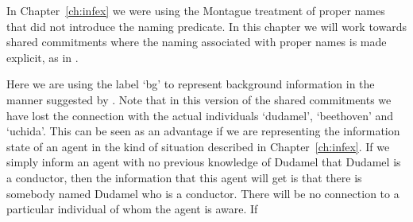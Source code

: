 In Chapter~\ref{ch:infex} we were using the Montague treatment of
proper names that did not introduce the naming predicate.  In this
chapter we will work towards shared commitments where the naming
associated with proper names is made explicit, as in \nexteg{}.
\begin{ex} 
\label{ex:gameboardDudamelBeethovenUchidaBg}  
\end{ex} 
Here we are using the label `bg' to represent background information
in the manner suggested by \cite{Larsson2010}.  Note that in this
version of the shared commitments we have lost the connection with the
actual individuals `dudamel', `beethoven' and `uchida'.  This can be
seen as an advantage if we are representing the information state of
an agent in the kind of situation described in Chapter~\ref{ch:infex}.
If we simply inform an agent with no previous knowledge of Dudamel that Dudamel
is a conductor, then the information that this agent will get is that
there is somebody named Dudamel who is a conductor.  There will be no
connection to a particular individual of whom the agent is aware.  If
